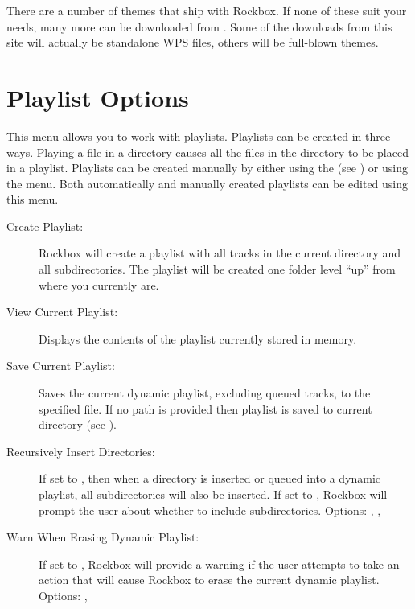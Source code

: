 There are a number of themes that ship with Rockbox. If none of
these suit your needs, many more can be downloaded from 
%
%
%
%
%
%
%
.
Some of the downloads from this site will actually be standalone WPS files, 
others will be full-blown themes. 




\section{\label{ref:playlistoptions}Playlist Options}
  This menu allows you to work with playlists. Playlists can be created in 
  three ways. Playing a file in a directory causes all the files in the 
  directory to be placed in a playlist. Playlists can be created manually by
  either using the   (see ) or using
  the  menu.  Both automatically and manually created
  playlists can be edited using this menu.

\begin{description}
\item[Create Playlist:]
  Rockbox will create a playlist with all tracks in the current directory 
and all subdirectories. The playlist will be created one folder level ``up'' 
from where you currently are.
  
\item[View Current Playlist:]
  Displays the contents of the playlist currently stored in memory.
  
\item[Save Current Playlist:]
  Saves the current dynamic playlist, excluding queued tracks, to the 
specified file. If no path is provided then playlist is saved to current 
directory (see ).
  
\item[Recursively Insert Directories: ]
  If set to , then when a directory is inserted or queued into a 
  dynamic playlist, all subdirectories will also be inserted. If set to ,
  Rockbox will prompt the user about whether to include subdirectories.
  Options: , , 

\item[Warn When Erasing Dynamic Playlist: ]
  If set to , Rockbox will provide a warning if the user attempts to
  take an action that will cause Rockbox to erase the current dynamic playlist.
  Options: , 
\end{description}

